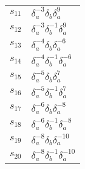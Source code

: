 \documentclass{article}
\begin{document}
\begin{center}
\begin{tabular}{ll}
$s_{11}$ & $\delta_a^{-3}\delta_b^{}\delta_a^{9}$ \\
$s_{12}$ & $\delta_a^{-3}\delta_b^{-1}\delta_a^{9}$ \\
$s_{13}$ & $\delta_a^{-4}\delta_b^{}\delta_a^{-6}$ \\
$s_{14}$ & $\delta_a^{-4}\delta_b^{-1}\delta_a^{-6}$ \\
$s_{15}$ & $\delta_a^{-5}\delta_b^{}\delta_a^{7}$ \\
$s_{16}$ & $\delta_a^{-5}\delta_b^{-1}\delta_a^{7}$ \\
$s_{17}$ & $\delta_a^{-6}\delta_b^{}\delta_a^{-8}$ \\
$s_{18}$ & $\delta_a^{-6}\delta_b^{-1}\delta_a^{-8}$ \\
$s_{19}$ & $\delta_a^{-8}\delta_b^{}\delta_a^{-10}$ \\
$s_{20}$ & $\delta_a^{-8}\delta_b^{-1}\delta_a^{-10}$ \\
\bottomrule
\end{tabular}
\end{center}

\thispagestyle{empty}
\end{document}
